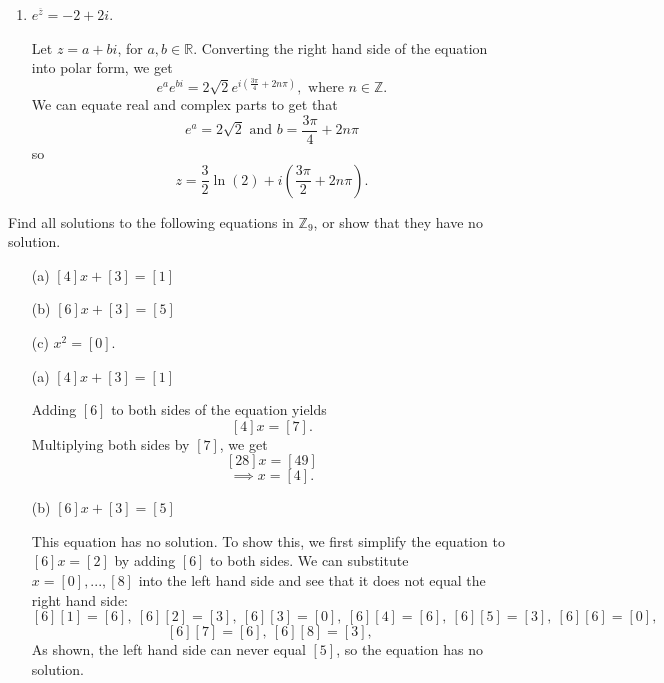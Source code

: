 \documentclass{article}
\newcommand{\cl}[1]{\overline{#1}}
\theoremstyle{plain} %
\numberwithin{thm}{section} %
\theoremstyle{definition}
\begin{document}
\begin{question}{1}
\begin{enumerate}
            \item \(e^{\cl{z}} = -2 + 2i\).
            
            Let \(z = a + bi\), for \(a,b \in \mathbb{R}\). Converting the right hand side of the equation into polar form, we get
            \[
                e^a e^{bi} = 2\sqrt{2} e^{i \left(\frac{3\pi} {4} + 2n \pi \right)}, \text{ where } n \in \mathbb{Z}.
            \]
            We can equate real and complex parts to get that
            \[
                e^a = 2\sqrt{2} \text{ and } b = \frac{3\pi}{4} + 2n \pi
            \]
            so
            \[
                z = \frac{3}{2}\ln (2) + i\left( \frac{3\pi}{2} + 2n \pi\right).
            \]
        \end{enumerate}
    \end{question}
    \newpage
    \begin{question}{2}
        Find all solutions to the following equations in \( \mathbb{Z}_9 \), or show that they have no solution.

        \begin{enumerate}
            \item[(a)] \([4]x + [3] = [1]\)
            \item[(b)] \([6]x + [3] = [5]\)
            \item[(c)] \(x^2 = [0]\).
        \end{enumerate}
        \tcblower
        \begin{enumerate}
            \item[(a)] \([4]x + [3] = [1]\)
            
            Adding \([6]\) to both sides of the equation yields
            \[
                [4]x = [7].
            \]
            Multiplying both sides by \([7]\), we get
            \[
                [28]x = [49]
            \]
            \[
                \implies x = [4].
            \]
            
            \item[(b)] \([6]x + [3] = [5]\)
            
            This equation has no solution. To show this, we first simplify the equation to \([6]x = [2]\) by adding \([6]\) to both sides. We can substitute \(x = [0], ..., [8]\) into the left hand side and see that it does not equal the right hand side:
            \[
                [6][1] = [6],\ [6][2] = [3],\ [6][3] = [0],\ [6][4] = [6],\ [6][5] = [3],\ [6][6] = [0],\ 
            \]
            \[
                [6][7] = [6],\ [6][8] = [3],\ 
            \]
            As shown, the left hand side can never equal \([5]\), so the equation has no solution.


\end{enumerate}
\end{question}
\end{document}
